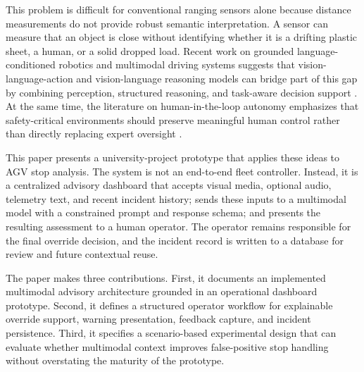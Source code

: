 \documentclass[conference]{IEEEtran}
\begin{document}
This problem is difficult for conventional ranging sensors alone because distance measurements do not provide robust semantic interpretation. A sensor can measure that an object is close without identifying whether it is a drifting plastic sheet, a human, or a solid dropped load. Recent work on grounded language-conditioned robotics and multimodal driving systems suggests that vision-language-action and vision-language reasoning models can bridge part of this gap by combining perception, structured reasoning, and task-aware decision support \cite{brohan2023rt2,ahn2022saycan,tian2024drivevlm}. At the same time, the literature on human-in-the-loop autonomy emphasizes that safety-critical environments should preserve meaningful human control rather than directly replacing expert oversight \cite{li2022haco}.

This paper presents a university-project prototype that applies these ideas to AGV stop analysis. The system is not an end-to-end fleet controller. Instead, it is a centralized advisory dashboard that accepts visual media, optional audio, telemetry text, and recent incident history; sends these inputs to a multimodal model with a constrained prompt and response schema; and presents the resulting assessment to a human operator. The operator remains responsible for the final override decision, and the incident record is written to a database for review and future contextual reuse.

The paper makes three contributions. First, it documents an implemented multimodal advisory architecture grounded in an operational dashboard prototype. Second, it defines a structured operator workflow for explainable override support, warning presentation, feedback capture, and incident persistence. Third, it specifies a scenario-based experimental design that can evaluate whether multimodal context improves false-positive stop handling without overstating the maturity of the prototype.
\end{document}
